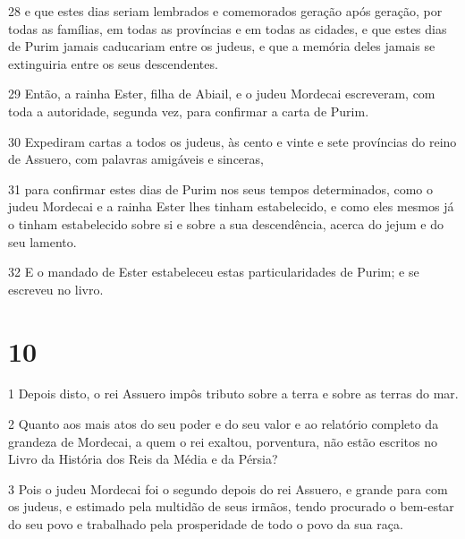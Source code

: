 \par 28 e que estes dias seriam lembrados e comemorados geração após geração, por todas as famílias, em todas as províncias e em todas as cidades, e que estes dias de Purim jamais caducariam entre os judeus, e que a memória deles jamais se extinguiria entre os seus descendentes.
\par 29 Então, a rainha Ester, filha de Abiail, e o judeu Mordecai escreveram, com toda a autoridade, segunda vez, para confirmar a carta de Purim.
\par 30 Expediram cartas a todos os judeus, às cento e vinte e sete províncias do reino de Assuero, com palavras amigáveis e sinceras,
\par 31 para confirmar estes dias de Purim nos seus tempos determinados, como o judeu Mordecai e a rainha Ester lhes tinham estabelecido, e como eles mesmos já o tinham estabelecido sobre si e sobre a sua descendência, acerca do jejum e do seu lamento.
\par 32 E o mandado de Ester estabeleceu estas particularidades de Purim; e se escreveu no livro.

\chapter{10}

\par 1 Depois disto, o rei Assuero impôs tributo sobre a terra e sobre as terras do mar.
\par 2 Quanto aos mais atos do seu poder e do seu valor e ao relatório completo da grandeza de Mordecai, a quem o rei exaltou, porventura, não estão escritos no Livro da História dos Reis da Média e da Pérsia?
\par 3 Pois o judeu Mordecai foi o segundo depois do rei Assuero, e grande para com os judeus, e estimado pela multidão de seus irmãos, tendo procurado o bem-estar do seu povo e trabalhado pela prosperidade de todo o povo da sua raça.


